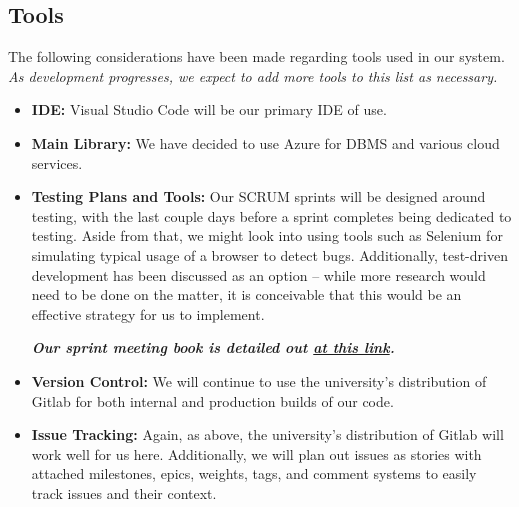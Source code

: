 \subsection{Tools}

The following considerations have been made regarding tools used in our system. \textit{As development progresses, we expect to add more tools to this list as necessary.}

\medskip

\begin{itemize}[nosep]
    \item \textbf{IDE:} Visual Studio Code will be our primary IDE of use.
    \item \textbf{Main Library:} We have decided to use Azure for DBMS and various cloud services.
    \item \textbf{Testing Plans and Tools:} Our SCRUM sprints will be designed around testing, with the last couple days before a sprint completes being dedicated to testing. Aside from that, we might look into using tools such as Selenium for simulating typical usage of a browser to detect bugs. Additionally, test-driven development has been discussed as an option -- while more research would need to be done on the matter, it is conceivable that this would be an effective strategy for us to implement.
    
    \medskip
    
    \textit{\textbf{Our sprint meeting book is detailed out \href{https://www.notion.so/jamen/385ff019a14a48f4bb42cc0db3f455a0?v=c59fd5ba269540628a170da3666289ad}{at this link}.}}
    
    \medskip
    
    \item \textbf{Version Control:} We will continue to use the university's distribution of Gitlab for both internal and production builds of our code.
    \item \textbf{Issue Tracking:} Again, as above, the university's distribution of Gitlab will work well for us here. Additionally, we will plan out issues as stories with attached milestones, epics, weights, tags, and comment systems to easily track issues and their context.
\end{itemize}